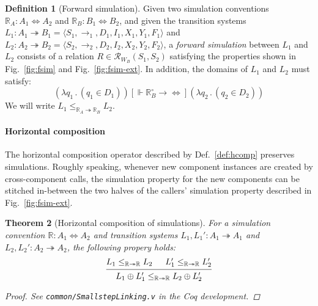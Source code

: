 \documentclass[draft,11pt]{report}
\newtheorem{theorem}{Theorem}[chapter]
\theoremstyle{definition}
\newtheorem{definition}[theorem]{Definition}
\newcommand{\ifr}[1]{\mathrel{[{#1}]}}
\newcommand{\que}{\circ}         %
\begin{document}
\begin{definition}[Forward simulation] \label{def:fsim} %
Given
two simulation conventions
$\mathbb{R}_A : A_1 \Leftrightarrow A_2$ and
$\mathbb{R}_B : B_1 \Leftrightarrow B_2$,
and given
the transition systems
$L_1 : A_1 \twoheadrightarrow B_1 = \langle S_1, {\rightarrow}_1, D_1, I_1, X_1, Y_1, F_1 \rangle$ and
$L_2 : A_2 \twoheadrightarrow B_2 = \langle S_2, {\rightarrow}_2, D_2, I_2, X_2, Y_2, F_2 \rangle$,
a \emph{forward simulation} between $L_1$ and $L_2$
consists of a relation
$R \in \mathcal{R}_{W_B}(S_1, S_2)$
satisfying the properties shown in
Fig.~\ref{fig:fsim} and Fig.~\ref{fig:fsim-ext}.
In addition, the domains of $L_1$ and $L_2$
must satisfy:
\[
  (\lambda q_1 \, . \, (q_1 \in D_1))
  \ifr{\Vdash \mathbb{R}_B^\que \rightarrow {\Leftrightarrow}}
  (\lambda q_2 \, . \, (q_2 \in D_2))
\]
We will write $L_1 \le_{\mathbb{R}_A \twoheadrightarrow \mathbb{R}_B} L_2$.
\end{definition}


\paragraph{Horizontal composition} %

The horizontal composition operator
described by Def.~\ref{def:hcomp}
preserves simulations.
Roughly speaking,
whenever new component instances are created
by cross-component calls,
the simulation property for the new components
can be stitched in-between
the two halves of the callers' simulation property
described in Fig.~\ref{fig:fsim-ext}.

\begin{theorem}[Horizontal composition of simulations] \label{thm:fsim-hcomp} %
For a simulation convention
$\mathbb{R} : A_1 \Leftrightarrow A_2$
and transition systems
$L_1, L_1' : A_1 \twoheadrightarrow A_1$ and
$L_2, L_2' : A_2 \twoheadrightarrow A_2$,
the following propery holds:
\[
  \begin{prooftree}
    \hypo{L_1 \le_{\mathbb{R} \twoheadrightarrow \mathbb{R}} L_2}
    \hypo{L_1' \le_{\mathbb{R} \twoheadrightarrow \mathbb{R}} L_2'}
    \infer2{L_1 \oplus L_1'
      \le_{\mathbb{R} \twoheadrightarrow \mathbb{R}}
      L_2 \oplus L_2'}
  \end{prooftree}
\]
\begin{proof}
See \texttt{common/SmallstepLinking.v}
in the Coq development.
\end{proof}
\end{theorem}
\end{document}
